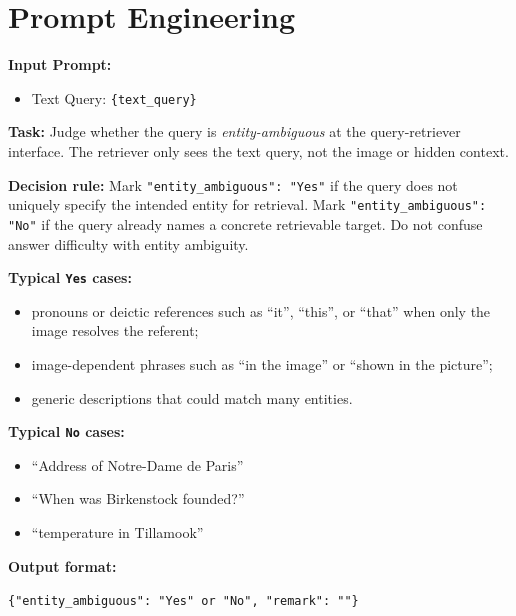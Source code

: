 \documentclass{article} %
\begin{document}
\section{Prompt Engineering}
\begin{tcolorbox}[
  title=Example: Entity Ambiguity Annotation Prompt,
  coltitle=black,
  colbacktitle=blue!8,
  colback=blue!5,
  colframe=black,
  fonttitle=\bfseries,
  arc=2mm,
  boxrule=0.5pt,
  enhanced jigsaw,
  breakable,
  width=\linewidth,
  left=6pt,
  right=6pt,
  top=6pt,
  bottom=6pt
]

\textbf{Input Prompt:}

\begin{itemize}
  \item Text Query: \texttt{\{text\_query\}}
\end{itemize}

\textbf{Task:}
Judge whether the query is \emph{entity-ambiguous} at the query-retriever interface.
The retriever only sees the text query, not the image or hidden context.

\textbf{Decision rule:}
Mark \texttt{"entity\_ambiguous": "Yes"} if the query does not uniquely specify the intended entity for retrieval.
Mark \texttt{"entity\_ambiguous": "No"} if the query already names a concrete retrievable target.
Do not confuse answer difficulty with entity ambiguity.

\textbf{Typical \texttt{Yes} cases:}
\begin{itemize}
  \item pronouns or deictic references such as ``it'', ``this'', or ``that'' when only the image resolves the referent;
  \item image-dependent phrases such as ``in the image'' or ``shown in the picture'';
  \item generic descriptions that could match many entities.
\end{itemize}

\textbf{Typical \texttt{No} cases:}
\begin{itemize}
  \item ``Address of Notre-Dame de Paris''
  \item ``When was Birkenstock founded?''
  \item ``temperature in Tillamook''
\end{itemize}

\textbf{Output format:}

\verb|{"entity_ambiguous": "Yes" or "No", "remark": ""}|
\end{tcolorbox}
\end{document}
